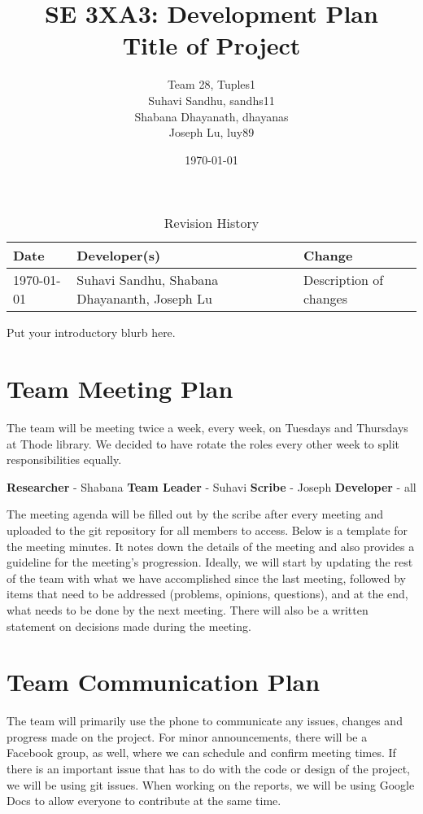 \documentclass{article}
\title{SE 3XA3: Development Plan\\Title of Project}
\author{Team 28, Tuples1
		\\ Suhavi Sandhu, sandhs11
		\\ Shabana Dhayanath, dhayanas
		\\ Joseph Lu, luy89
}
\date{\today}
\begin{document}
\begin{table}[hp]
\caption{Revision History} \label{TblRevisionHistory}
\begin{tabularx}{\textwidth}{llX}
\toprule
\textbf{Date} & \textbf{Developer(s)} & \textbf{Change}\\
\midrule
\today & Suhavi Sandhu, Shabana Dhayananth, Joseph Lu & Description of changes\\
\bottomrule
\end{tabularx}
\end{table}

\newpage

\maketitle

Put your introductory blurb here.

\section{Team Meeting Plan}
The team will be meeting twice a week, every week, on Tuesdays and Thursdays at Thode library. We decided to have rotate the roles every other week to split responsibilities equally.

\textbf{Researcher} - Shabana
\textbf{Team Leader} - Suhavi
\textbf{Scribe} - Joseph
\textbf{Developer} - all 

The meeting agenda will be filled out by the scribe after every meeting and uploaded to the git repository for all members to access. Below is a template for the meeting minutes. It notes down the details of the meeting and also provides a guideline for the meeting’s progression. Ideally, we will start by updating the rest of the team with what we have accomplished since the last meeting, followed by items that need to be addressed (problems, opinions, questions), and at the end, what needs to be done by the next meeting. There will also be a written statement on decisions made during the meeting.

\section{Team Communication Plan}

The team will primarily use the phone to communicate any issues, changes and progress made on the project. For minor announcements, there will be a Facebook group, as well, where we can schedule and confirm meeting times. If there is an important issue that has to do with the code or design of the project, we will be using git issues. When working on the reports, we will be using Google Docs to allow everyone to contribute at the same time.
\end{document}

